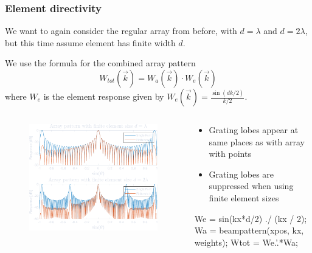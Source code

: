 \documentclass[compress]{beamer}
\begin{document}
\begin{frame}[fragile] %
    \frametitle{Element directivity}
    We want to again consider the regular array from before, with $d=\lambda$ and
    $d=2\lambda$, but this time assume element has finite width $d$.

    We use the formula for the combined array pattern
    \begin{equation*}
        W_{tot}\left(\vec{k}\right) = W_a\left(\vec{k}\right)\cdot W_e\left(\vec{k}\right)
    \end{equation*}
    where $W_e$ is the element response given by
    $W_e\left(\vec{k}\right) = \frac{\sin\left(dk/2\right)}{k/2}$.
    \begin{columns}
        \begin{column}{0.5\textwidth}
            \begin{figure}
                \includegraphics[width=\columnwidth]{"../11.pdf"}
            \end{figure}
        \end{column}
        \begin{column}{0.5\textwidth}
            \begin{itemize}
                \item Grating lobes appear at same places as with array with points
                \item Grating lobes are suppressed when using finite element sizes
            \end{itemize}
            \begin{jllisting}[gobble=16,language=Matlab]
                We = sin(kx*d/2) ./ (kx / 2);
                Wa = beampattern(xpos, kx, weights);
                Wtot = We.'.*Wa;
            \end{jllisting}
        \end{column}
    \end{columns}
\end{frame}
\end{document}
